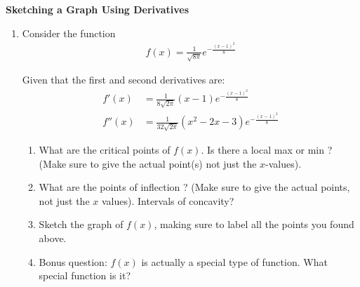 \documentclass[11pt]{article}
\begin{document}

\centerline{\textbf{\Large{Sketching a Graph Using Derivatives}}}

\vspace{0.2in}
 
\begin{enumerate}
\item Consider the function
\begin{align*}
	f(x) = \frac{1}{\sqrt{8 \pi}} e^{- \frac{(x - 1)^2}{8}}
\end{align*}

Given that the first and second derivatives are:
\begin{align*}
	f'(x) &= \frac{1}{8 \sqrt{2 \pi}} (x - 1) e^{- \frac{(x - 1)^2}{8}} \\
	f''(x) &= \frac{1}{32 \sqrt{2 \pi}} (x^2 - 2x - 3) e^{- \frac{(x - 1)^2}{8}}
\end{align*}

\begin{enumerate}
	\item What are the critical points of $f(x)$. Is there a local max or min ? (Make sure to give the actual point(s) not just the $x$-values). 
	\item What are the points of inflection ? (Make sure to give the actual points, not just the $x$ values). Intervals of concavity? 
	\item Sketch the graph of $f(x)$, making sure to label all the points you found above. 
	\item Bonus question: $f(x)$ is actually a special type of function. What special function is it? 

\end{enumerate}

\end{enumerate}
\end{document}
